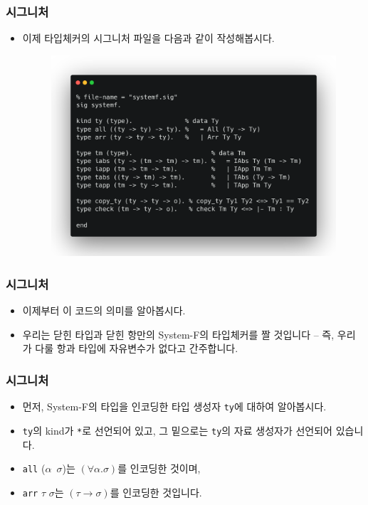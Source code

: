 \documentclass[slidestop,compress,mathserif]{beamer}
\begin{document}
    \begin{frame}
        \frametitle{시그니처}
        \begin{itemize}
            \item 이제 타입체커의 시그니처 파일을 다음과 같이 작성해봅시다.
            \begin{figure}[h]
                \begin{center}
                    \includegraphics[width=1.0\linewidth]{sig.png}
                \end{center}
            \end{figure}
        \end{itemize}
    \end{frame}

    \begin{frame}
        \frametitle{시그니처}
        \begin{itemize}
            \item 이제부터 이 코드의 의미를 알아봅시다.
            \item 우리는 닫힌 타입과 닫힌 항만의 System-F의 타입체커를 짤 것입니다 -- 즉, 우리가 다룰 항과 타입에 자유변수가 없다고 간주합니다.
        \end{itemize}
    \end{frame}

    \begin{frame}
        \frametitle{시그니처}
        \begin{itemize}
            \item 먼저, System-F의 타입을 인코딩한 타입 생성자 \texttt{ty}에 대하여 알아봅시다.
            \item \texttt{ty}의 kind가 \texttt{*}로 선언되어 있고, 그 밑으로는 \texttt{ty}의 자료 생성자가 선언되어 있습니다.
            \item \texttt{all} ($\alpha$\texttt{\string\ }$\sigma$)는 $\left( \forall \alpha . \sigma \right)$를 인코딩한 것이며,
            \item \texttt{arr} $\tau$ $\sigma$는 $\left( \tau \to \sigma \right)$를 인코딩한 것입니다.
        \end{itemize}
    \end{frame}
\end{document}
